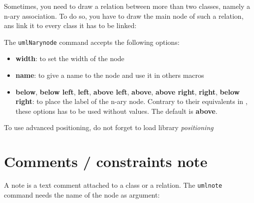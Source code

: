 \documentclass[a4paper,11pt]{report}
\begin{document}
Sometimes, you need to draw a relation between more than two classes, namely a n-ary association. To do so, you have to draw the main node of such a relation, ans link it to every class it has to be linked:

\medskip

\begin{minipage}{0.5\textwidth}

\end{minipage}
\begin{minipage}{0.4\textwidth}
\begin{center}
\end{center}
\end{minipage}

\medskip

The {\tt umlNarynode} command accepts the following options:

\begin{itemize}
\item {\bf width}: to set the width of the node
\item {\bf name}: to give a name to the node and use it in others macros
\item {\bf below}, {\bf below left}, {\bf left}, {\bf above left}, {\bf above}, {\bf above right}, {\bf right}, {\bf below right}: to place the label of the n-ary node. Contrary to their equivalents in \TikZ, these options has to be used without values. The default is {\bf above}. 
\end{itemize}

\begin{remark}
To use advanced positioning, do not forget to load \TikZ library {\em positioning}
\end{remark}

\section{Comments / constraints note}\label{s.note}

A note is a text comment attached to a class or a relation. The {\tt umlnote} command needs the name of the node as argument:

\medskip

\begin{minipage}{0.5\textwidth}

\end{minipage}
\begin{minipage}{0.4\textwidth}
\begin{center}
\end{center}
\end{minipage}
\end{document}
